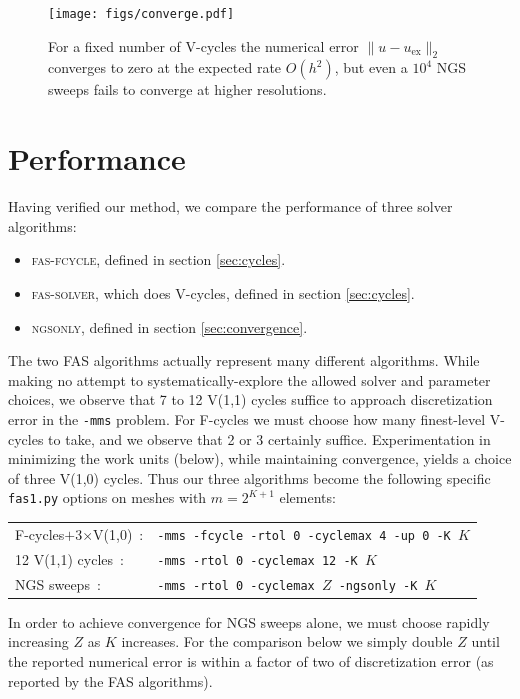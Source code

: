 \documentclass[letterpaper,final,12pt,reqno]{amsart}
\begin{document}
\begin{figure}
\texttt{[image: figs/converge.pdf]}
\caption{For a fixed number of V-cycles the numerical error $\|u-u_{\text{ex}}\|_2$ converges to zero at the expected rate $O(h^2)$, but even a $10^4$ NGS sweeps fails to converge at higher resolutions.}
\label{fig:converge}
\end{figure}


\section{Performance}  \label{sec:performance}

Having verified our method, we compare the performance of three solver algorithms:

\begin{itemize}
\item \textsc{fas-fcycle}, defined in section \ref{sec:cycles}.
\item \textsc{fas-solver}, which does V-cycles, defined in section \ref{sec:cycles}.
\item \textsc{ngsonly}, defined in section \ref{sec:convergence}.
\end{itemize}

The two FAS algorithms actually represent many different algorithms.  While making no attempt to systematically-explore the allowed solver and parameter choices, we observe that 7 to 12 V(1,1) cycles suffice to approach discretization error in the \texttt{-mms} problem.  For F-cycles we must choose how many finest-level V-cycles to take, and we observe that 2 or 3 certainly suffice.  Experimentation in minimizing the work units (below), while maintaining convergence, yields a choice of three V(1,0) cycles.  Thus our three algorithms become the following specific \texttt{fas1.py} options on meshes with $m=2^{K+1}$ elements:

\medskip
\begin{tabular}{ll}
\textsf{F-cycles$+$3$\times$V(1,0)} \,:        &\texttt{-mms -fcycle -rtol 0 -cyclemax 4 -up 0 -K }$K$ \\
\textsf{12 V(1,1) cycles} \,:  &\texttt{-mms -rtol 0 -cyclemax 12 -K }$K$ \\
\textsf{NGS sweeps} \,:      &\texttt{-mms -rtol 0 -cyclemax $Z$ -ngsonly -K }$K$
\end{tabular}

\medskip
In order to achieve convergence for NGS sweeps alone, we must choose rapidly increasing $Z$ as $K$ increases.  For the comparison below we simply double $Z$ until the reported numerical error is within a factor of two of discretization error (as reported by the FAS algorithms).
\end{document}
